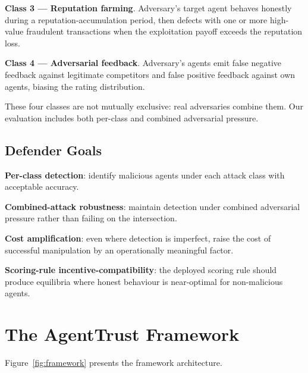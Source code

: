\documentclass[sigconf,nonacm]{acmart}
\begin{document}
\textbf{Class 3 --- Reputation farming}. Adversary's target agent
behaves honestly during a reputation-accumulation period, then
defects with one or more high-value fraudulent transactions when
the exploitation payoff exceeds the reputation loss.

\textbf{Class 4 --- Adversarial feedback}. Adversary's agents emit
false negative feedback against legitimate competitors and false
positive feedback against own agents, biasing the rating
distribution.

These four classes are not mutually exclusive: real adversaries
combine them. Our evaluation includes both per-class and combined
adversarial pressure.

\subsection{Defender Goals}

\textbf{Per-class detection}: identify malicious agents under each
attack class with acceptable accuracy.

\textbf{Combined-attack robustness}: maintain detection under
combined adversarial pressure rather than failing on the
intersection.

\textbf{Cost amplification}: even where detection is imperfect,
raise the cost of successful manipulation by an operationally
meaningful factor.

\textbf{Scoring-rule incentive-compatibility}: the deployed scoring
rule should produce equilibria where honest behaviour is
near-optimal for non-malicious agents.

\section{The AgentTrust Framework}

Figure~\ref{fig:framework} presents the framework architecture.
\end{document}
